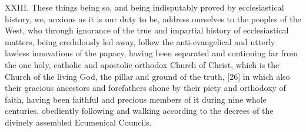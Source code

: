 XXIII. These things being so, and being indisputably proved by
ecclesiastical history, we, anxious as it is our duty to be, address
ourselves to the peoples of the West, who through ignorance of the true
and impartial history of ecclesiastical matters, being credulously led
away, follow the anti-evangelical and utterly lawless innovations of the
papacy, having been separated and continuing far from the one holy,
catholic and apostolic orthodox Church of Christ, which is
\textquotesingle the Church of the living God, the pillar and ground of
the truth, {[}26{]} in which also their gracious ancestors and
forefathers shone by their piety and orthodoxy of faith, having been
faithful and precious members of it during nine whole centuries,
obediently following and walking according to the decrees of the
divinely assembled Ecumenical Councils.

